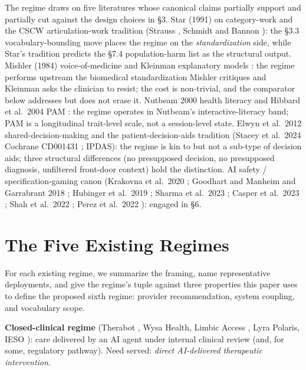 \documentclass[letterpaper]{article}
\begin{document}
The regime draws on five literatures whose canonical claims partially support and partially cut against the design choices in \S3. Star (1991) \citep{star1991power} on category-work and the CSCW articulation-work tradition (Strauss \citep{strauss1993permutations}, Schmidt and Bannon \citep{schmidt1992cscw}): the \S3.3 vocabulary-bounding move places the regime on the \emph{standardization} side, while Star's tradition predicts the \S7.4 population-harm list as the structural output. Mishler (1984) \citep{mishler1984discourse} voice-of-medicine and Kleinman explanatory models \citep{kleinman1988narratives}: the regime performs upstream the biomedical standardization Mishler critiques and Kleinman asks the clinician to resist; the cost is non-trivial, and the comparator below addresses but does not erase it. Nutbeam 2000 health literacy \citep{nutbeam2000literacy} and Hibbard et al.~2004 PAM \citep{hibbard2004pam}: the regime operates in Nutbeam's interactive-literacy band; PAM is a longitudinal trait-level scale, not a session-level state. Elwyn et al.~2012 shared-decision-making \citep{elwyn2012sdm} and the patient-decision-aids tradition (Stacey et al.~2024 Cochrane CD001431 \citep{stacey2024cochrane}; IPDAS): the regime is kin to but not a sub-type of decision aids; three structural differences (no presupposed decision, no presupposed diagnosis, unfiltered front-door context) hold the distinction. AI safety / specification-gaming canon (Krakovna et al.~2020 \citep{krakovna2020specification}; Goodhart \citep{goodhart1975} and Manheim and Garrabrant 2018 \citep{manheim2018goodhart}; Hubinger et al.~2019 \citep{hubinger2019mesa}; Sharma et al.~2023 \citep{sharma2023sycophancy}; Casper et al.~2023 \citep{casper2023rlhf}; Shah et al.~2022 \citep{shah2022goal}; Perez et al.~2022 \citep{perez2022evaluations}): engaged in \S6.

\section{The Five Existing Regimes}

For each existing regime, we summarize the framing, name representative deployments, and give the regime's tuple against three properties this paper uses to define the proposed sixth regime: provider recommendation, system coupling, and vocabulary scope.

\textbf{Closed-clinical regime} (Therabot \citep{heinz2025therabot}, Wysa Health, Limbic Access \citep{habicht2024limbic}, Lyra Polaris, IESO \citep{ieso2024}): care delivered by an AI agent under internal clinical review (and, for some, regulatory pathway). Need served: \emph{direct AI-delivered therapeutic intervention}.
\end{document}
